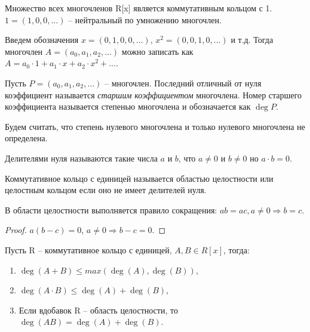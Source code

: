 \begin{proposition}
    Множество всех многочленов R[x] является коммутативным кольцом с 1. $1 = (1, 0, 0,\ldots)$ -- нейтральный по умножению многочлен.
\end{proposition}

\begin{definition}
    Введем обозначения $x = (0, 1, 0, 0, \ldots)$, $x^2 = (0, 0, 1, 0, \ldots)$ и т.д. Тогда многочлен $A = (a_0, a_1, a_2, \ldots)$ можно записать как $A = a_0 \cdot 1 + a_1 \cdot x + a_2 \cdot x^2 + \ldots$.
\end{definition}

\begin{definition}
    Пусть $P = (a_0, a_1, a_2, \ldots)$ -- многочлен. Последний отличный от нуля коэффициент называется \textit{старшим коэффициентом} многочлена. Номер старшего коэффициента называется степенью многочлена и обозначается как $\deg P$.
\end{definition}

\begin{note}
    Будем считать, что степень нулевого многочлена и только нулевого многочлена не определена.
\end{note}

\begin{reminder}
    Делителями нуля называются такие числа $a$ и $b$, что $a \neq 0$ и $b \neq 0$ но $a \cdot b = 0$.
\end{reminder}

\begin{definition}
    Коммутативное кольцо с единицей называется областью целостности или целостным кольцом если оно 
    не имеет делителей нуля.
\end{definition}

\begin{proposition} 
    В области целостности выполняется правило сокращения:
    $ab = ac, a \neq 0 \Rightarrow b = c$.
\end{proposition}

\begin{proof}
    $a(b-c) = 0$, $a \neq 0 \Rightarrow b-c = 0$.
\end{proof}

\begin{proposition}
    Пусть R -- коммутативное кольцо с единицей, $A, B \in R[x]$, тогда:
    \begin{enumerate}
        \item $\deg(A+B) \leq max(\deg(A), \deg(B))$,
        \item $\deg(A \cdot B) \leq \deg(A) + \deg(B)$,
        \item Если вдобавок R -- область целостности, то $\deg(AB) = \deg(A) + \deg(B)$.
    \end{enumerate}
\end{proposition}

